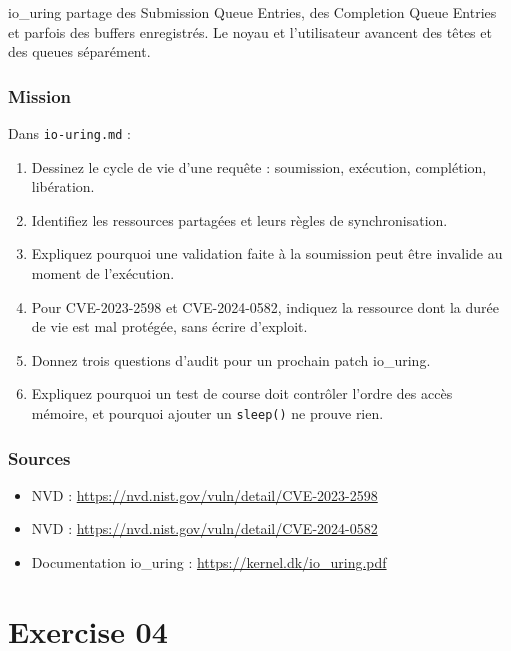 \documentclass{training}
\begin{document}
io\_uring partage des Submission Queue Entries, des Completion Queue
Entries et parfois des buffers enregistrés. Le noyau et l'utilisateur
avancent des têtes et des queues séparément.

\subsection*{Mission}

Dans \texttt{io-uring.md} :

\begin{enumerate}
  \item Dessinez le cycle de vie d'une requête : soumission, exécution,
        complétion, libération.
  \item Identifiez les ressources partagées et leurs règles de
        synchronisation.
  \item Expliquez pourquoi une validation faite à la soumission peut être
        invalide au moment de l'exécution.
  \item Pour CVE-2023-2598 et CVE-2024-0582, indiquez la ressource dont la
        durée de vie est mal protégée, sans écrire d'exploit.
  \item Donnez trois questions d'audit pour un prochain patch io\_uring.
  \item Expliquez pourquoi un test de course doit contrôler l'ordre des
        accès mémoire, et pourquoi ajouter un \texttt{sleep()} ne prouve
        rien.
\end{enumerate}

\subsection*{Sources}
\begin{itemize}
  \item NVD : \url{https://nvd.nist.gov/vuln/detail/CVE-2023-2598}
  \item NVD : \url{https://nvd.nist.gov/vuln/detail/CVE-2024-0582}
  \item Documentation io\_uring :
        \url{https://kernel.dk/io_uring.pdf}
\end{itemize}

\chapter{Exercise 04}
\makeheaderfiles
\end{document}
